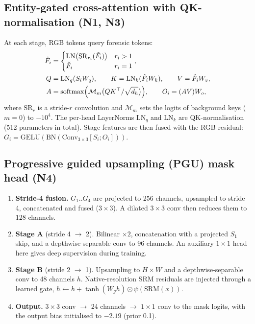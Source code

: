 \documentclass[10pt,a4paper]{article}
\begin{document}
\subsection{Entity-gated cross-attention with QK-normalisation \textnormal{(N1, N3)}}\label{sec:xattn}
At each stage, RGB tokens query forensic tokens:
\begin{align}
\hat F_i &= \begin{cases}\mathrm{LN}\bigl(\mathrm{SR}_{r_i}(\tilde F_i)\bigr) & r_i>1\\ \tilde F_i & r_i=1\end{cases},\\
Q &= \mathrm{LN}_q(S_iW_q),\qquad K=\mathrm{LN}_k(\hat F_iW_k),\qquad V=\hat F_iW_v,\\
A &= \operatorname{softmax}\Bigl(\mathcal{M}_{m}\bigl(QK^{\top}/\sqrt{d_h}\bigr)\Bigr),\qquad O_i=(AV)W_o,
\end{align}
where $\mathrm{SR}_{r}$ is a stride-$r$ convolution and $\mathcal{M}_m$ sets the logits of
background keys ($m=0$) to $-10^{4}$. The per-head LayerNorms $\mathrm{LN}_q$ and
$\mathrm{LN}_k$ are QK-normalisation~\cite{qknorm} (512 parameters in total). Stage
features are then fused with the RGB residual:
$G_i=\mathrm{GELU}(\mathrm{BN}(\mathrm{Conv}_{3\times3}[S_i;O_i]))$.

\subsection{Progressive guided upsampling (PGU) mask head \textnormal{(N4)}}\label{sec:pgu}
\begin{enumerate}
  \item \textbf{Stride-4 fusion.} $G_1..G_4$ are projected to 256 channels, upsampled to
        stride 4, concatenated and fused ($3\times3$). A dilated $3\times3$ conv then
        reduces them to 128 channels.
  \item \textbf{Stage A} (stride 4 $\rightarrow$ 2). Bilinear $\times2$, concatenation with a
        projected $S_1$ skip, and a depthwise-separable conv to 96 channels. An auxiliary
        $1\times1$ head here gives deep supervision during training.
  \item \textbf{Stage B} (stride 2 $\rightarrow$ 1). Upsampling to $H\times W$ and a
        depthwise-separable conv to 48 channels $h$. Native-resolution SRM residuals are
        injected through a learned gate, $h\leftarrow h+\tanh(W_g h)\odot\psi(\mathrm{SRM}(x))$.
  \item \textbf{Output.} $3\times3$ conv $\rightarrow$ 24 channels $\rightarrow$ $1\times1$
        conv to the mask logits, with the output bias initialised to $-2.19$ (prior 0.1).
\end{enumerate}
\end{document}
